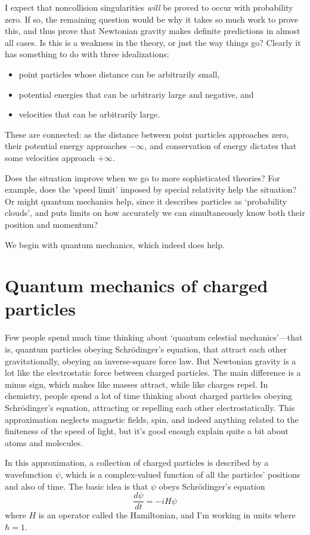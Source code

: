 \documentclass[12pt]{article}
\begin{document}
I expect that noncollision singularities \emph{will} be proved to occur with probability zero.  If so, the remaining question would be why it takes so much work to prove this, and thus prove that Newtonian gravity makes definite predictions in almost all cases.  Is this is a weakness in the theory, or just the way things go?   Clearly it has something to do with three idealizations:
\begin{itemize} 
\item point particles whose distance can be arbitrarily small,
\item potential energies that can be arbitrariy large and negative, and 
\item velocities that can be arbitrarily large.
\end{itemize}  
These are connected: as the distance between point particles approaches zero, their potential energy approaches $-\infty$, and conservation of energy dictates that some velocities approach $+\infty$.  

Does the situation improve when we go to more sophisticated theories?  For example, does the `speed limit' imposed by special relativity help the situation?  Or might quantum mechanics help, since it describes particles as `probability clouds', and puts limits on how accurately we can simultaneously know both their position and momentum?

We begin with quantum mechanics, which indeed does help.

\section{Quantum mechanics of charged particles}
\label{quantum}

Few people spend much time thinking about `quantum celestial mechanics'---that is, quantum particles obeying Schr\"odinger's equation, that attract each other gravitationally, obeying an inverse-square force law.   But Newtonian gravity is a lot like the electrostatic force between charged particles.  The main difference is a minus sign, which makes like masses attract, while like charges repel.  In chemistry, people spend a lot of time thinking about charged particles obeying Schr\"odinger's equation, attracting or repelling each other electrostatically.  This approximation neglects magnetic fields, spin, and indeed anything related to the finiteness of the speed of light, but it's good enough explain quite a bit about atoms and molecules.

In this approximation, a collection of charged particles is described by a 
wavefunction $\psi$, which is a complex-valued function of all the particles' positions 
and also of time.   The basic idea is that $\psi$ obeys Schr\"odinger's
equation
\[ \frac{d \psi}{dt} = - i H \psi \]
where $H$ is an operator called the Hamiltonian, and I'm working in units where $\hbar = 1$.  
\end{document}
